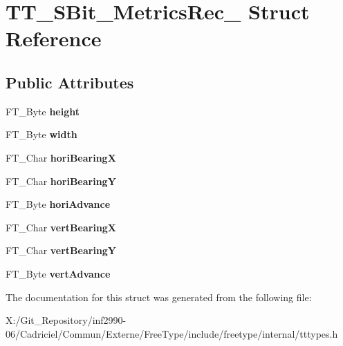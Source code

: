 \hypertarget{struct_t_t___s_bit___metrics_rec__}{\section{T\-T\-\_\-\-S\-Bit\-\_\-\-Metrics\-Rec\-\_\- Struct Reference}
\label{struct_t_t___s_bit___metrics_rec__}
}
\subsection*{Public Attributes}
\begin{DoxyCompactItemize}
\item 
\hypertarget{struct_t_t___s_bit___metrics_rec___a79b25794122888101aae80c7b74fc1fc}{F\-T\-\_\-\-Byte {\bfseries height}}\label{struct_t_t___s_bit___metrics_rec___a79b25794122888101aae80c7b74fc1fc}

\item 
\hypertarget{struct_t_t___s_bit___metrics_rec___a3444618e2c2a612a662a5e0d2c3f25ef}{F\-T\-\_\-\-Byte {\bfseries width}}\label{struct_t_t___s_bit___metrics_rec___a3444618e2c2a612a662a5e0d2c3f25ef}

\item 
\hypertarget{struct_t_t___s_bit___metrics_rec___a786ba1081993e18d514ddf37c2662c7b}{F\-T\-\_\-\-Char {\bfseries hori\-Bearing\-X}}\label{struct_t_t___s_bit___metrics_rec___a786ba1081993e18d514ddf37c2662c7b}

\item 
\hypertarget{struct_t_t___s_bit___metrics_rec___aaed1567b444a1bee4b3478b2cdb9259f}{F\-T\-\_\-\-Char {\bfseries hori\-Bearing\-Y}}\label{struct_t_t___s_bit___metrics_rec___aaed1567b444a1bee4b3478b2cdb9259f}

\item 
\hypertarget{struct_t_t___s_bit___metrics_rec___a8b0c5271aaf220f7a8cbf4838854e220}{F\-T\-\_\-\-Byte {\bfseries hori\-Advance}}\label{struct_t_t___s_bit___metrics_rec___a8b0c5271aaf220f7a8cbf4838854e220}

\item 
\hypertarget{struct_t_t___s_bit___metrics_rec___a626e67e02494faab653a7543bb0b7c79}{F\-T\-\_\-\-Char {\bfseries vert\-Bearing\-X}}\label{struct_t_t___s_bit___metrics_rec___a626e67e02494faab653a7543bb0b7c79}

\item 
\hypertarget{struct_t_t___s_bit___metrics_rec___aef4755ed22ba72e5fa304920bae03146}{F\-T\-\_\-\-Char {\bfseries vert\-Bearing\-Y}}\label{struct_t_t___s_bit___metrics_rec___aef4755ed22ba72e5fa304920bae03146}

\item 
\hypertarget{struct_t_t___s_bit___metrics_rec___a947468e42759089d0b5c5fa10a0defdf}{F\-T\-\_\-\-Byte {\bfseries vert\-Advance}}\label{struct_t_t___s_bit___metrics_rec___a947468e42759089d0b5c5fa10a0defdf}

\end{DoxyCompactItemize}


The documentation for this struct was generated from the following file\-:\begin{DoxyCompactItemize}
\item 
X\-:/\-Git\-\_\-\-Repository/inf2990-\/06/\-Cadriciel/\-Commun/\-Externe/\-Free\-Type/include/freetype/internal/tttypes.\-h\end{DoxyCompactItemize}
